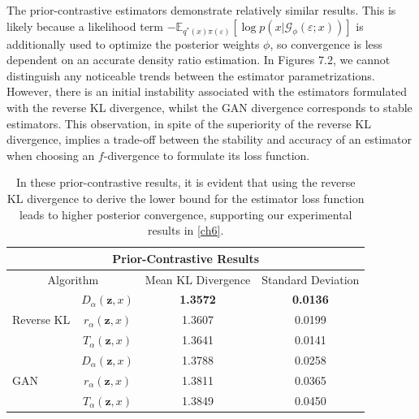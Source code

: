 \documentclass[honours,12pt, twoside]{unswthesis}
\newcommand{\E}{\mathbb{E}}
\numberwithin{equation}{section}
\theoremstyle{definition}
\begin{document}
The prior-contrastive estimators demonstrate relatively similar results. This is likely because a likelihood term $-\E_{q^*(x)\pi(\varepsilon)}[\log p(x|\mathcal{G}_\phi(\varepsilon;x))]$ is additionally used to optimize the posterior weights $\phi$, so convergence is less dependent on an accurate density ratio estimation. In Figures 7.2, we cannot distinguish any noticeable trends between the estimator parametrizations. However, there is an initial instability associated with the estimators formulated with the reverse KL divergence, whilst the GAN divergence corresponds to stable estimators. This observation, in spite of the superiority of the reverse KL divergence, implies a trade-off between the stability and accuracy of an estimator when choosing an $f$-divergence to formulate its loss function.
\begin{table}[h]
\centering
\begin{tabular}{|l|c|c|c|}
\hline
\multicolumn{4}{|c|}{Prior-Contrastive Results}\\
\hline
\multicolumn{2}{|c|}{Algorithm} & Mean KL Divergence & Standard Deviation\\
\hline
\multirow{3}{*}{Reverse KL} & $D_\alpha(\bm{z},x)$ & \textbf{1.3572} & \textbf{0.0136}\\
\cline{2-4}
& $r_\alpha(\bm{z},x)$ & 1.3607 & 0.0199\\
\cline{2-4}
& $T_\alpha(\bm{z},x)$ & 1.3641 & 0.0141\\
\hline
\multirow{3}{*}{GAN} & $D_\alpha(\bm{z},x)$ & 1.3788 & 0.0258\\
\cline{2-4}
& $r_\alpha(\bm{z},x)$ & 1.3811 & 0.0365\\
\cline{2-4}
& $T_\alpha(\bm{z},x)$ & 1.3849 & 0.0450\\
\hline
\end{tabular}
\caption{\small In these prior-contrastive results, it is evident that using the reverse KL divergence to derive the lower bound for the estimator loss function leads to higher posterior convergence, supporting our experimental results in \autoref{ch6}.}
\label{tab:7.1}
\end{table}
\end{document}
